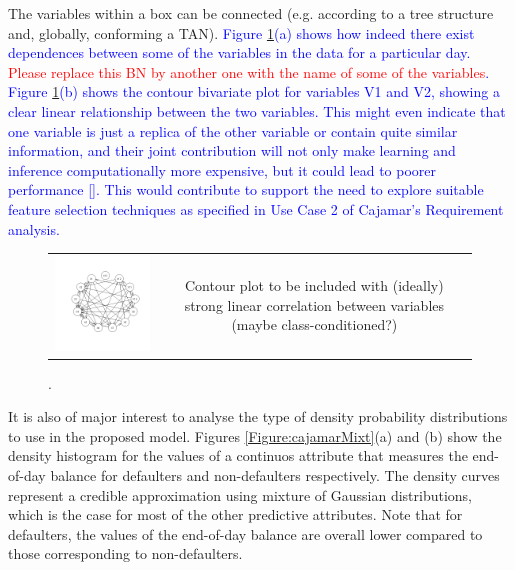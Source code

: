 The variables within a box can be connected (e.g. according to a tree structure and, globally, conforming a TAN). \textcolor{blue}{Figure \ref{Figure:cajamarDependences}(a) shows how indeed there exist dependences between some of the variables in the data for a particular day. \textcolor{red}{Please replace this BN by another one with the name of some of the variables}. Figure \ref{Figure:cajamarDependences}(b) shows the contour bivariate plot for variables V1 and V2, showing a clear linear relationship between the two variables. This might even indicate that one variable is just a replica of the other variable or contain quite similar information, and their joint contribution will not only make learning and inference computationally more expensive, but it could lead to poorer performance []. This would contribute to support the need to explore suitable feature selection techniques as specified in Use Case 2 of Cajamar's Requirement analysis.}

\begin{figure}
  \centering
    \begin{tabular}{cc}
    \includegraphics[width=70mm]{figures/CajaMarBayesianNetwork}&
    \begin{minipage}[b]{0.45\linewidth} Contour plot to be included with (ideally) strong linear correlation between variables (maybe class-conditioned?) \end{minipage}\\
  \end{tabular}
    \caption{\label{Figure:cajamarDependences}.}
\end{figure}

It is also of major interest to analyse the type of density probability distributions to use in the proposed model. Figures \ref{Figure:cajamarMixt}(a) and (b) show the density histogram for the values of a continuos attribute that measures the end-of-day balance for defaulters and non-defaulters respectively. The density curves represent a credible approximation using mixture of Gaussian distributions, which is the case for most of the other predictive attributes. Note that for defaulters, the values of the end-of-day balance are overall lower compared to those corresponding to non-defaulters.

